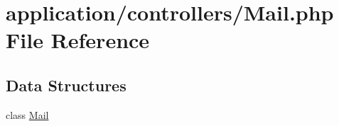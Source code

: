\hypertarget{_mail_8php}{}\section{application/controllers/\+Mail.php File Reference}
\label{_mail_8php}
\subsection*{Data Structures}
\begin{DoxyCompactItemize}
\item 
class \mbox{\hyperlink{class_mail}{Mail}}
\end{DoxyCompactItemize}
